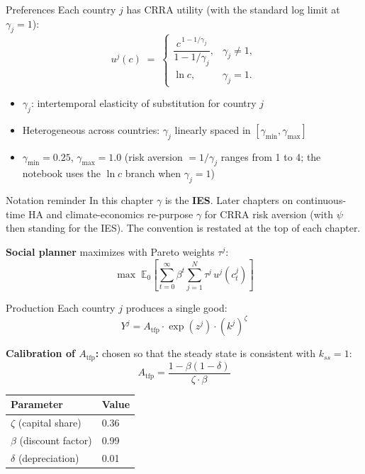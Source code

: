 \documentclass[aspectratio=169,11pt]{beamer}
\newcommand{\emphc}[1]{\textcolor{harvardcrimson}{#1}}
\begin{document}
\begin{frame}{Preferences}
Each country $j$ has \emphc{CRRA utility} (with the standard log limit at $\gamma_j = 1$):
\[
u^j(c) \;=\; \begin{cases} \dfrac{c^{\,1 - 1/\gamma_j}}{1 - 1/\gamma_j}, & \gamma_j \neq 1, \\[4pt] \ln c, & \gamma_j = 1. \end{cases}
\]

\vspace{0.3em}
\begin{itemize}
    \item $\gamma_j$: intertemporal elasticity of substitution for country $j$
    \item \emphc{Heterogeneous} across countries: $\gamma_j$ linearly spaced in $[\gamma_{\min}, \gamma_{\max}]$
    \item $\gamma_{\min} = 0.25$, $\gamma_{\max} = 1.0$ (risk aversion $= 1/\gamma_j$ ranges from 1 to 4; the notebook uses the $\ln c$ branch when $\gamma_j = 1$)
\end{itemize}

\vspace{0.3em}
\begin{block}{Notation reminder}
{\footnotesize In this chapter $\gamma$ is the \textbf{IES}.  Later chapters on continuous-time HA and climate-economics re-purpose $\gamma$ for CRRA risk aversion (with $\psi$ then standing for the IES).  The convention is restated at the top of each chapter.}
\end{block}

\vspace{0.5em}
\textbf{Social planner} maximizes with Pareto weights $\tau^j$:
\[
\max \; \mathbb{E}_0\!\left[\sum_{t=0}^{\infty} \beta^t \sum_{j=1}^{N} \tau^j \, u^j(c_t^j)\right]
\]
\end{frame}

\begin{frame}{Production}
Each country $j$ produces a single good:
\[
Y^j = A_{\text{tfp}} \cdot \exp(z^j) \cdot (k^j)^\zeta
\]

\vspace{0.3em}
\textbf{Calibration of $A_{\text{tfp}}$:} chosen so that the \emphc{steady state} is consistent with $k_{ss} = 1$:
\[
\boxed{A_{\text{tfp}} = \frac{1 - \beta(1-\delta)}{\zeta \cdot \beta}}
\]

\vspace{0.5em}
\begin{center}
\begin{tabular}{ll}
\toprule
\textbf{Parameter} & \textbf{Value} \\
\midrule
$\zeta$ (capital share) & 0.36 \\
$\beta$ (discount factor) & 0.99 \\
$\delta$ (depreciation) & 0.01 \\
\bottomrule
\end{tabular}
\end{center}
\end{frame}
\end{document}
